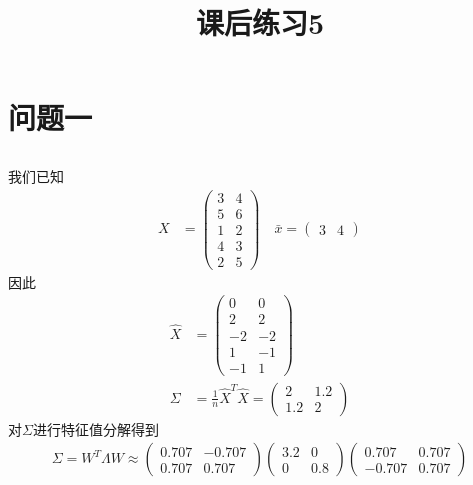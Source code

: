 \documentclass[12pt, a4paper]{article}
\title{课后练习5}
\author{}
\date{}
\begin{document}
\maketitle %

\section{问题一}

\subsection{}

我们已知
\begin{align*}
    X&=\begin{pmatrix}
        3&4\\5&6\\1&2\\4&3\\2&5
    \end{pmatrix}\quad
    \bar{x}=\begin{pmatrix}
        3&4
    \end{pmatrix}
\end{align*}
因此
\begin{align*}
    \hat{X}&=\begin{pmatrix}
        0&0\\2&2\\-2&-2\\1&-1\\-1&1
    \end{pmatrix}\\
    \Sigma&=\frac{1}{n}\hat{X}^T\hat{X}=\begin{pmatrix}
        2&1.2\\1.2&2
    \end{pmatrix}
\end{align*}
对$\Sigma$进行特征值分解得到
\begin{align*}
    \Sigma = W^T \Lambda W \approx 
    \begin{pmatrix}
        0.707&-0.707\\0.707&0.707
    \end{pmatrix}
    \begin{pmatrix}
        3.2&0\\0&0.8
    \end{pmatrix}
    \begin{pmatrix}
        0.707&0.707\\-0.707&0.707
    \end{pmatrix}
\end{align*}
\end{document}
